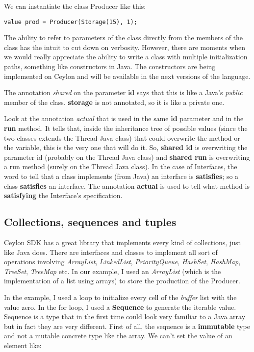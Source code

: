 We can instantiate the class Producer like this:

\begin{lstlisting}[label=cpc,caption=Ceylon Producer-Consumer example]
value prod = Producer(Storage(15), 1);
\end{lstlisting}

The ability to refer to parameters of the class directly from the members of the
class has the intuit to cut down on verbosity. However, there are moments when
we would really appreciate the ability to write a class with multiple
initialization paths, something like constructors in Java. The constructors are
being implemented on Ceylon and will be available in the next versions of the
language.

The annotation \textit{shared} on the parameter \textbf{id} says that this is like a Java's
\textit{public} member of the class. \textbf{storage} is not annotated, so it is like a
private one.

Look at the annotation \textit{actual} that is used in the same \textbf{id} parameter and in
the \textbf{run} method. It tells that, inside the inheritance tree of possible
values (since the two classes extends the Thread Java class) that could
overwrite the method or the variable, this is the very one that will do it. So,
\textbf{shared id} is overwriting the parameter id (probably on the Thread Java
class) and \textbf{shared run} is overwriting a run method (surely on the Thread Java
class). In the case of Interfaces, the word to tell that a class implements
(from Java) an interface is \textbf{satisfies}; so a class \textbf{satisfies} an
interface. The annotation \textbf{actual} is used to tell what method is
\textbf{satisfying} the Interface's specification.

\subsection{Collections, sequences and tuples}

Ceylon SDK has a great library that implements every kind of collections, just
like Java does. There are interfaces and classes to implement all sort of
operations involving \textit{ArrayList}, \textit{LinkedList}, 
\textit{PriorityQueue}, \textit{HashSet}, \textit{HashMap}, \textit{TreeSet},
\textit{TreeMap} etc\cite{2_3}. In our example, I used an \textit{ArrayList}
(which is the implementation of a list using arrays) to store the production of
the Producer.

In the example, I used a loop to initialize every cell of the \textit{buffer}
list with the value zero. In the for loop, I used a \textbf{Sequence} to
generate the iterable value. Sequence is a type that in the first time could
look very familiar to a Java array but in fact they are very different. First of
all, the sequence is a \textbf{immutable} type and not a mutable concrete type
like the array. We can't set the value of an element like:


